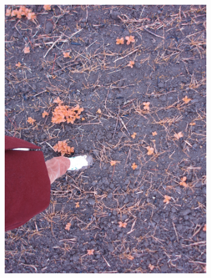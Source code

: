 \begin{figure}[H]
    \centering
    \captionsetup[subfigure]{justification=centering}
    \begin{subfigure}[b]{0.49\textwidth}
        \centering
        \includegraphics[width=\textwidth]{./figure/result/images/img_orig.jpg}
		\caption{}
		\label{fig:seg_a}
    \end{subfigure}
    \begin{subfigure}[b]{0.49\textwidth}
        \centering

\end{subfigure}
\end{figure}
